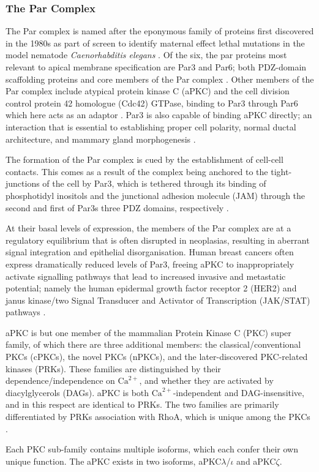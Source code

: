 \subsubsection{The Par Complex}
The Par complex is named after the eponymous family of proteins first
discovered in the 1980s as part of screen to identify maternal effect lethal
mutations in the model nematode {\it Caenorhabditis elegans}
\citep{kemphues1988,goldstein2007}.
Of the six, the par proteins most relevant to apical membrane specification are
Par3 and Par6; both PDZ-domain scaffolding proteins and core members of the Par
complex \citep{yu2014,hung1999}. Other
members of the Par complex include atypical protein kinase C (aPKC) and the
cell division control protein 42 homologue (Cdc42) GTPase, binding to Par3
through Par6 which here acts as an adaptor \citep{joberty2000}.
Par3 is also capable of binding aPKC directly; an interaction that is essential
to establishing proper cell polarity, normal ductal architecture, and mammary
gland morphogenesis \citep{nagai2002, mccaffrey2009}.\par

The formation of the Par complex is cued by the establishment of cell-cell
contacts. This comes as a result of the complex being anchored to the tight-
junctions of the cell by Par3, which is tethered through its binding of
phosphotidyl inositols and the junctional adhesion molecule (JAM) through the
second and first of Par3s three PDZ domains, respectively \citep{wu2007,ebnet2001}.\par

At their basal levels of expression, the members of the Par complex are at a
regulatory equilibrium that is often disrupted in neoplasias, resulting in
aberrant signal integration and epithelial disorganisation. Human breast
cancers often express dramatically reduced levels of Par3, freeing aPKC to
inappropriately activate signalling pathways that lead to increased invasive and
metastatic potential; namely the human epidermal growth factor receptor 2 (HER2)
and janus kinase/two Signal Transducer and Activator of Transcription (JAK/STAT)
pathways \citep{xue2013,mccaffrey2012}.\par

aPKC is but one member of the mammalian Protein Kinase C (PKC) super family, of
which there are three additional members: the classical/conventional PKCs
(cPKCs), the novel PKCs (nPKCs), and the later-discovered PKC-related kinases
(PRKs). These families are distinguished by their dependence/independence
on $\textrm{Ca}^{2+}$, and whether they are activated by diacylglycerols (DAGs). aPKC is both $\textrm{Ca}^{2+}$-independent and DAG-insensitive, and in this respect are identical to PRKs.
The two families are primarily differentiated by PRKs association with RhoA,
which is unique among the PKCs \citep{mellor1998}.\par

Each PKC sub-family contains multiple isoforms, which each confer their own
unique function. The aPKC exists in two isoforms, aPKC$\lambda$/$\iota$ and aPKC$\zeta$.\par
